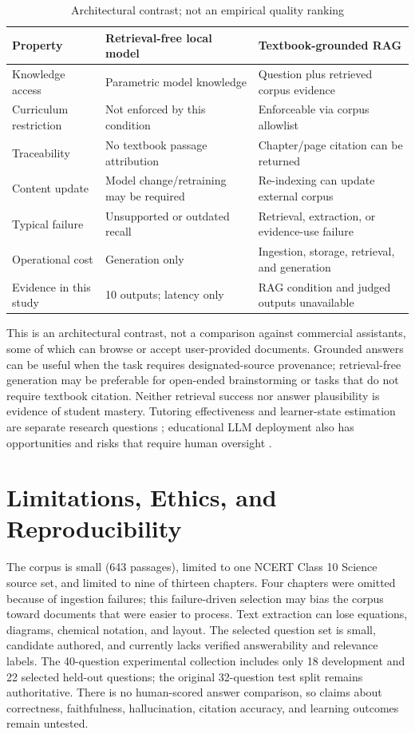 \documentclass[conference]{IEEEtran}
\begin{document}
\begin{table}[t]
\caption{Architectural contrast; not an empirical quality ranking}
\label{tab:conditions}
\centering\footnotesize
\begin{tabular}{p{}p{}p{}}
\hline
Property & Retrieval-free local model & Textbook-grounded RAG\\ \hline
Knowledge access & Parametric model knowledge & Question plus retrieved corpus evidence\\
Curriculum restriction & Not enforced by this condition & Enforceable via corpus allowlist\\
Traceability & No textbook passage attribution & Chapter/page citation can be returned\\
Content update & Model change/retraining may be required & Re-indexing can update external corpus\\
Typical failure & Unsupported or outdated recall & Retrieval, extraction, or evidence-use failure\\
Operational cost & Generation only & Ingestion, storage, retrieval, and generation\\
Evidence in this study & 10 outputs; latency only & RAG condition and judged outputs unavailable\\
\hline
\end{tabular}
\end{table}

This is an architectural contrast, not a comparison against commercial assistants, some of which can browse or accept user-provided documents. Grounded answers can be useful when the task requires designated-source provenance; retrieval-free generation may be preferable for open-ended brainstorming or tasks that do not require textbook citation. Neither retrieval success nor answer plausibility is evidence of student mastery. Tutoring effectiveness and learner-state estimation are separate research questions \cite{r71,r72,r73}; educational LLM deployment also has opportunities and risks that require human oversight \cite{r74}.

\section{Limitations, Ethics, and Reproducibility}
The corpus is small (643 passages), limited to one NCERT Class 10 Science source set, and limited to nine of thirteen chapters. Four chapters were omitted because of ingestion failures; this failure-driven selection may bias the corpus toward documents that were easier to process. Text extraction can lose equations, diagrams, chemical notation, and layout. The selected question set is small, candidate authored, and currently lacks verified answerability and relevance labels. The 40-question experimental collection includes only 18 development and 22 selected held-out questions; the original 32-question test split remains authoritative. There is no human-scored answer comparison, so claims about correctness, faithfulness, hallucination, citation accuracy, and learning outcomes remain untested.
\end{document}
